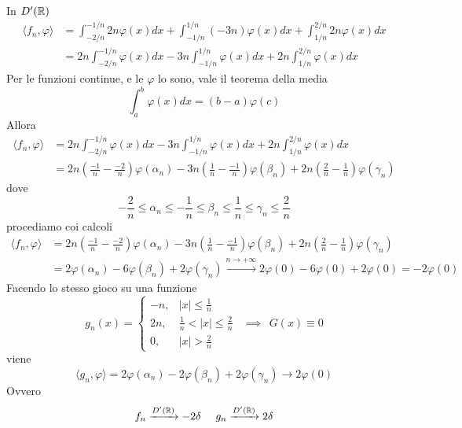 In $D'(\mathbb{R} )$
\begin{equation*}
\begin{aligned}
\langle f_{n} ,\varphi \rangle  & =\int ^{-1/n}_{-2/n} 2n\varphi ( x) dx+\int ^{1/n}_{-1/n}( -3n) \varphi ( x) dx+\int ^{2/n}_{1/n} 2n\varphi ( x) dx\\
 & =2n\int ^{-1/n}_{-2/n} \varphi ( x) dx-3n\int ^{1/n}_{-1/n} \varphi ( x) dx+2n\int ^{2/n}_{1/n} \varphi ( x) dx
\end{aligned}
\end{equation*}
Per le funzioni continue, e le $\varphi $ lo sono, vale il teorema della media
\begin{equation*}
\int ^{b}_{a} \varphi ( x) dx=( b-a) \varphi ( c)
\end{equation*}
Allora
\begin{equation*}
\begin{aligned}
\langle f_{n} ,\varphi \rangle  & =2n\int ^{-1/n}_{-2/n} \varphi ( x) dx-3n\int ^{1/n}_{-1/n} \varphi ( x) dx+2n\int ^{2/n}_{1/n} \varphi ( x) dx\\
 & =2n\left(\frac{-1}{n} -\frac{-2}{n}\right) \varphi ( \alpha _{n}) -3n\left(\frac{1}{n} -\frac{-1}{n}\right) \varphi ( \beta _{n}) +2n\left(\frac{2}{n} -\frac{1}{n}\right) \varphi ( \gamma _{n})
\end{aligned}
\end{equation*}
dove
\begin{equation*}
-\frac{2}{n} \leqslant \alpha _{n} \leqslant -\frac{1}{n} \leqslant \beta _{n} \leqslant \frac{1}{n} \leqslant \gamma _{n} \leqslant \frac{2}{n}
\end{equation*}
procediamo coi calcoli
\begin{equation*}
\begin{aligned}
\langle f_{n} ,\varphi \rangle  & =2n\left(\frac{-1}{n} -\frac{-2}{n}\right) \varphi ( \alpha _{n}) -3n\left(\frac{1}{n} -\frac{-1}{n}\right) \varphi ( \beta _{n}) +2n\left(\frac{2}{n} -\frac{1}{n}\right) \varphi ( \gamma _{n})\\
 & =2\varphi ( \alpha _{n}) -6\varphi ( \beta _{n}) +2\varphi ( \gamma _{n})\xrightarrow{n\rightarrow +\infty } 2\varphi ( 0) -6\varphi ( 0) +2\varphi ( 0) =-2\varphi ( 0)
\end{aligned}
\end{equation*}
Facendo lo stesso gioco su una funzione
\begin{equation*}
g_{n} (x)=\begin{cases}
-n, & |x|\leq \frac{1}{n}\\
2n, & \frac{1}{n} < |x|\leq \frac{2}{n}\\
0, & |x| >\frac{2}{n}
\end{cases} \ \ \implies \ \ G( x) \equiv 0
\end{equation*}
viene
\begin{equation*}
\langle g_{n} ,\varphi \rangle =2\varphi ( \alpha _{n}) -2\varphi ( \beta _{n}) +2\varphi ( \gamma _{n})\rightarrow 2\varphi ( 0)
\end{equation*}
Ovvero
\begin{equation*}
f_{n}\xrightarrow{D'(\mathbb{R} )} -2\delta \ \ \ \ g_{n}\xrightarrow{D'(\mathbb{R} )} 2\delta 
\end{equation*}
\Soluzione

